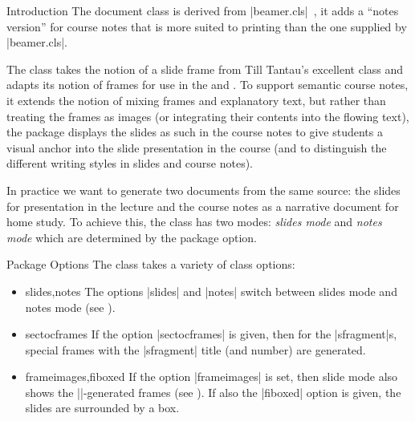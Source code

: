 \begin{sfragment}{Introduction}
  The  document class is derived from |beamer.cls|~\cite{beamerclass:on},
it adds a ``notes version'' for course notes that is more suited to printing than the one
supplied by |beamer.cls|.

The  class takes the notion of a slide frame from Till Tantau's excellent
 class and adapts its notion of frames for use in the \sTeX and \omdoc. To
support semantic course notes, it extends the notion of mixing frames and explanatory
text, but rather than treating the frames as images (or integrating their contents into
the flowing text), the  package displays the slides as such in the course
notes to give students a visual anchor into the slide presentation in the course (and to
distinguish the different writing styles in slides and course notes).

In practice we want to generate two documents from the same source: the slides for
presentation in the lecture and the course notes as a narrative document for home
study. To achieve this, the  class has two modes: \emph{slides mode} and
\emph{notes mode} which are determined by the package option. 
\end{sfragment}

\begin{sfragment}{Package Options}
  The  class takes a variety of class options:
  \begin{itemize}
  \item
    \begin{variable}{slides,notes} The options |slides| and |notes| switch between
      slides mode and notes mode (see ).
    \end{variable}
  \item
    \begin{variable}{sectocframes} If the option |sectocframes| is given, then for the
      |sfragment|s, special frames with the |sfragment| title (and number) are generated.
    \end{variable}
  \item
    \begin{variable}{frameimages,fiboxed}
      If the option |frameimages| is set, then slide mode also shows the
      |\frameimage|-generated frames (see ). If also the
      |fiboxed| option is given, the slides are surrounded by a box.
    \end{variable}
  \end{itemize}
\end{sfragment}

